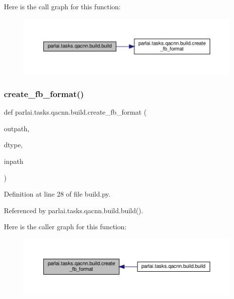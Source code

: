Here is the call graph for this function\+:
\nopagebreak
\begin{figure}[H]
\begin{center}
\leavevmode
\includegraphics[width=350pt]{namespaceparlai_1_1tasks_1_1qacnn_1_1build_a75d46e5e4248f77e7a6b83c7038144fa_cgraph}
\end{center}
\end{figure}
\mbox{\label{namespaceparlai_1_1tasks_1_1qacnn_1_1build_add8d5f440ef973d77d8f63cc11197dce}} 
\subsubsection{\texorpdfstring{create\+\_\+fb\+\_\+format()}{create\_fb\_format()}}
{\footnotesize\ttfamily def parlai.\+tasks.\+qacnn.\+build.\+create\+\_\+fb\+\_\+format (\begin{DoxyParamCaption}\item[{}]{outpath,  }\item[{}]{dtype,  }\item[{}]{inpath }\end{DoxyParamCaption})}



Definition at line 28 of file build.\+py.



Referenced by parlai.\+tasks.\+qacnn.\+build.\+build().

Here is the caller graph for this function\+:
\nopagebreak
\begin{figure}[H]
\begin{center}
\leavevmode
\includegraphics[width=350pt]{namespaceparlai_1_1tasks_1_1qacnn_1_1build_add8d5f440ef973d77d8f63cc11197dce_icgraph}
\end{center}
\end{figure}

